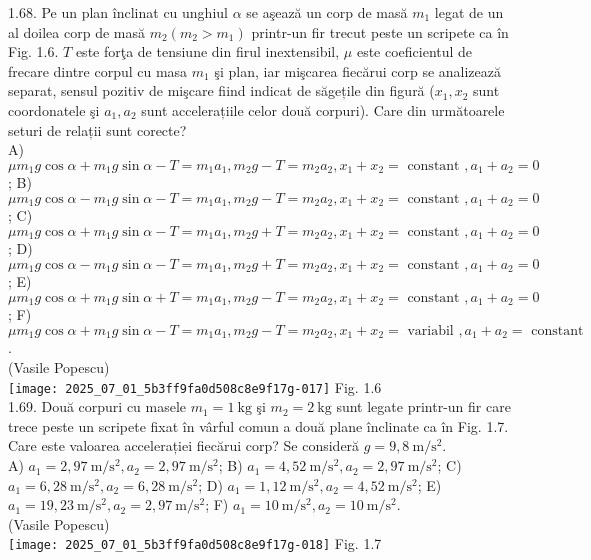 1.68. Pe un plan înclinat cu unghiul $\alpha$ se aşează un corp de masă $m_{1}$ legat de un al doilea corp de masă $m_{2} \left(m_{2}>m_{1}\right)$ printr-un fir trecut peste un scripete ca în Fig. 1.6. $T$ este forţa de tensiune din firul inextensibil, $\mu$ este coeficientul de frecare dintre corpul cu masa $m_{1}$ şi plan, iar mişcarea fiecărui corp se analizează separat, sensul pozitiv de mişcare fiind indicat de săgețile din figură ($x_{1}, x_{2}$ sunt coordonatele şi $a_{1}, a_{2}$ sunt accelerațiile celor două corpuri). Care din următoarele seturi de relații sunt corecte?\\ A) $\mu m_{1} g \cos \alpha+m_{1} g \sin \alpha-T=m_{1} a_{1}, m_{2} g-T=m_{2} a_{2}, x_{1}+x_{2}=\text{ constant }, a_{1}+a_{2}=0$; B) $\mu m_{1} g \cos \alpha-m_{1} g \sin \alpha-T=m_{1} a_{1}, m_{2} g-T=m_{2} a_{2}, x_{1}+x_{2}=\text{ constant }, a_{1}+a_{2}=0$; C) $\mu m_{1} g \cos \alpha+m_{1} g \sin \alpha-T=m_{1} a_{1}, m_{2} g+T=m_{2} a_{2}, x_{1}+x_{2}=\text{ constant }, a_{1}+a_{2}=0$; D) $\mu m_{1} g \cos \alpha-m_{1} g \sin \alpha-T=m_{1} a_{1}, m_{2} g+T=m_{2} a_{2}, x_{1}+x_{2}=\text{ constant }, a_{1}+a_{2}=0$; E) $\mu m_{1} g \cos \alpha+m_{1} g \sin \alpha+T=m_{1} a_{1}, m_{2} g-T=m_{2} a_{2}, x_{1}+x_{2}=\text{ constant }, a_{1}+a_{2}=0$; F) $\mu m_{1} g \cos \alpha+m_{1} g \sin \alpha-T=m_{1} a_{1}, m_{2} g-T=m_{2} a_{2}, x_{1}+x_{2}=\text{ variabil }, a_{1}+a_{2}=\text{ constant }$.\\ (Vasile Popescu)\\ \texttt{[image: 2025\_07\_01\_5b3ff9fa0d508c8e9f17g-017]} Fig. 1.6\\

1.69. Două corpuri cu masele $m_{1}=1 \mathrm{~kg}$ şi $m_{2}=2 \mathrm{~kg}$ sunt legate printr-un fir care trece peste un scripete fixat în vârful comun a două plane înclinate ca în Fig. 1.7. Care este valoarea accelerației fiecărui corp? Se consideră $g=9,8 \mathrm{~m} / \mathrm{s}^{2}$.\\ A) $a_{1}=2,97 \mathrm{~m} / \mathrm{s}^{2}, a_{2}=2,97 \mathrm{~m} / \mathrm{s}^{2}$; B) $a_{1}=4,52 \mathrm{~m} / \mathrm{s}^{2}, a_{2}=2,97 \mathrm{~m} / \mathrm{s}^{2}$; C) $a_{1}=6,28 \mathrm{~m} / \mathrm{s}^{2}, a_{2}=6,28 \mathrm{~m} / \mathrm{s}^{2}$; D) $a_{1}=1,12 \mathrm{~m} / \mathrm{s}^{2}, a_{2}=4,52 \mathrm{~m} / \mathrm{s}^{2}$; E) $a_{1}=19,23 \mathrm{~m} / \mathrm{s}^{2}, a_{2}=2,97 \mathrm{~m} / \mathrm{s}^{2}$; F) $a_{1}=10 \mathrm{~m} / \mathrm{s}^{2}, a_{2}=10 \mathrm{~m} / \mathrm{s}^{2}$.\\ (Vasile Popescu)\\ \texttt{[image: 2025\_07\_01\_5b3ff9fa0d508c8e9f17g-018]} Fig. 1.7\\

